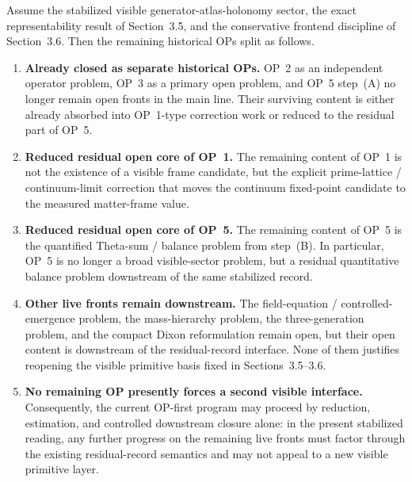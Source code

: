 \begin{theorem}
\label{thm:mainline-3700}
Assume the stabilized visible generator-atlas-holonomy sector, the exact representability result of Section~3.5, and the conservative frontend discipline of Section~3.6. Then the remaining historical OPs split as follows.
\begin{enumerate}[label=(\roman*), leftmargin=2em]
  \item \textbf{Already closed as separate historical OPs.}
  OP~2 as an independent operator problem, OP~3 as a primary open problem, and OP~5 step~(A) no longer remain open fronts in the main line. Their surviving content is either already absorbed into OP~1-type correction work or reduced to the residual part of OP~5.
  \item \textbf{Reduced residual open core of OP~1.}
  The remaining content of OP~1 is not the existence of a visible frame candidate, but the explicit prime-lattice / continuum-limit correction that moves the continuum fixed-point candidate to the measured matter-frame value.
  \item \textbf{Reduced residual open core of OP~5.}
  The remaining content of OP~5 is the quantified Theta-sum / balance problem from step~(B). In particular, OP~5 is no longer a broad visible-sector problem, but a residual quantitative balance problem downstream of the same stabilized record.
  \item \textbf{Other live fronts remain downstream.}
  The field-equation / controlled-emergence problem, the mass-hierarchy problem, the three-generation problem, and the compact Dixon reformulation remain open, but their open content is downstream of the residual-record interface. None of them justifies reopening the visible primitive basis fixed in Sections~3.5--3.6.
  \item \textbf{No remaining OP presently forces a second visible interface.}
  Consequently, the current OP-first program may proceed by reduction, estimation, and controlled downstream closure alone: in the present stabilized reading, any further progress on the remaining live fronts must factor through the existing residual-record semantics and may not appeal to a new visible primitive layer.
\end{enumerate}
\end{theorem}


